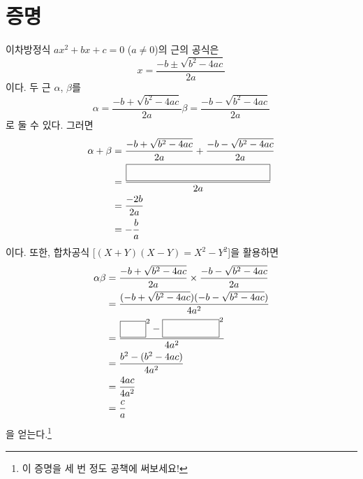 \documentclass{oblivoir}
\newcommand{\pb}[1]%
{\fbox{\phantom{\ensuremath{#1}}}}
\begin{document}
\section{증명}
이차방정식 \(ax^2+bx+c=0\) (\(a\neq0\))의 근의 공식은
\[x=\frac{-b\pm\sqrt{b^2-4ac}}{2a}\]
이다.
두 근 \(\alpha\), \(\beta\)를
\[
\alpha=\frac{-b+\sqrt{b^2-4ac}}{2a}
\beta=\frac{-b-\sqrt{b^2-4ac}}{2a}
\]
로 둘 수 있다.
그러면
\begin{align*}
\alpha+\beta
&=\frac{-b+\sqrt{b^2-4ac}}{2a}+\frac{-b-\sqrt{b^2-4ac}}{2a}\\
&=\frac{\pb{-b+\sqrt{b^2-4ac}-b-\sqrt{b^2-4ac}}}{2a}\\
&=\frac{-2b}{2a}\\
&=-\frac ba
\end{align*}
이다.
또한, 합차공식 [\((X+Y)(X-Y)=X^2-Y^2\)]을 활용하면
\begin{align*}
\alpha\beta
&=\frac{-b+\sqrt{b^2-4ac}}{2a}\times\frac{-b-\sqrt{b^2-4ac}}{2a}\\
&=\frac{(-b+\sqrt{b^2-4ac})(-b-\sqrt{b^2-4ac})}{4a^2}\\
&=\frac{\pb{(-b)}^2-\pb{(\sqrt{b^2-4ac})}^2}{4a^2}\\
&=\frac{b^2-(b^2-4ac)}{4a^2}\\
&=\frac{4ac}{4a^2}\\
&=\frac ca
\end{align*}
을 얻는다.\footnote{이 증명을 세 번 정도 공책에 써보세요!}
\end{document}
